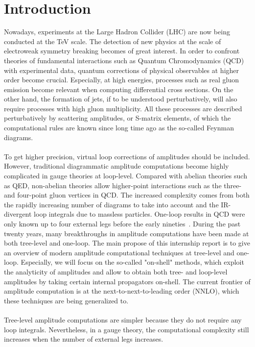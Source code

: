 \section{Introduction}
Nowadays, experiments at the Large Hadron Collider (LHC) are now being conducted at the TeV scale.
The detection of new physics at the scale of electroweak symmetry breaking becomes of great interest. 
In order to confront theories of fundamental interactions such as Quantum Chromodynamics (QCD) with experimental data,
quantum corrections of physical observables at higher order become crucial. 
Especially, at high energies, processes such as real gluon emission become relevant when computing differential cross sections. 
On the other hand, the formation of jets, if to be understood perturbatively, will also require processes with high gluon multiplicity.
All these processes are described perturbatively by scattering amplitudes, or S-matrix elements, of which the computational rules are known since long time ago as the so-called Feynman diagrams. 
\\\\
To get higher precision, virtual loop corrections of amplitudes should be included.
However, traditional diagrammatic amplitude computations become highly complicated in gauge theories at loop-level.
Compared with abelian theories such as QED, non-abelian theories allow higher-point interactions such as the three- and four-point gluon vertices in QCD.
The increased complexity comes from both the rapidly increasing number of diagrams to take into account and the IR-divergent loop integrals due to massless particles.  
One-loop results in QCD were only known up to four external legs before the early nineties~\cite{Bern:1994zx}. 
During the past twenty years, many breakthroughs in amplitude computations have been made at both tree-level and one-loop.
The main propose of this internship report is to give an overview of modern amplitude computational techniques at tree-level and one-loop.
Especially, we will focus on the so-called "on-shell" methods, which exploit the analyticity of amplitudes and allow to obtain both tree- and loop-level amplitudes by taking certain internal propagators on-shell.  
The current frontier of amplitude computation is at the next-to-next-to-leading order (NNLO), which these techniques are being generalized to.
\\\\
Tree-level amplitude computations are simpler because they do not require any loop integrals.
Nevertheless, in a gauge theory, the computational complexity still increases when the number of external legs increases.
